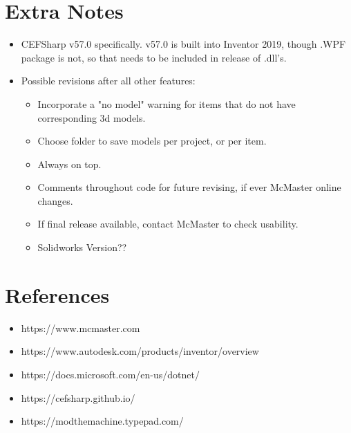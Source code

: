 \documentclass[12pt, letterpaper]{article}
\begin{document}
\section{Extra Notes}
\begin{itemize}
    \item CEFSharp v57.0 specifically. v57.0 is built into Inventor 2019, though .WPF package is not, so that needs to be included in release of .dll's.
    \item Possible revisions after all other features:
    \begin{itemize}
        \item Incorporate a "no model" warning for items that do not have corresponding 3d models.
        \item Choose folder to save models per project, or per item.
        \item Always on top.
        \item Comments throughout code for future revising, if ever McMaster online changes.
        \item If final release available, contact McMaster to check usability. 
        \item Solidworks Version??
    \end{itemize}
\end{itemize}
\section{References}

\begin{itemize}
\item https://www.mcmaster.com\cite{McMaster}
\item https://www.autodesk.com/products/inventor/overview
\item https://docs.microsoft.com/en-us/dotnet/
\item https://cefsharp.github.io/
\item https://modthemachine.typepad.com/

\end{itemize}
\begingroup
\renewcommand{\section}[2]{}


\endgroup
\newpage
\end{document}
